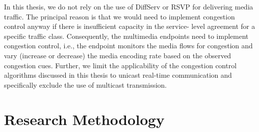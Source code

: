 





In this thesis, we do not rely on the use of DiffServ or RSVP for delivering
media traffic. The principal reason is that we would need to implement
congestion control anyway if there is insufficient capacity in the  service-
level agreement for a specific traffic class. Consequently, the multimedia
endpoints need to implement congestion control, i.e., the endpoint monitors
the media flows for congestion and vary (increase or decrease) the media
encoding rate based on the observed congestion cues. Further, we limit the
applicability of the congestion control algorithms discussed in this thesis to
unicast real-time communication and specifically exclude the use of multicast
transmission. 



\section{Research Methodology}

